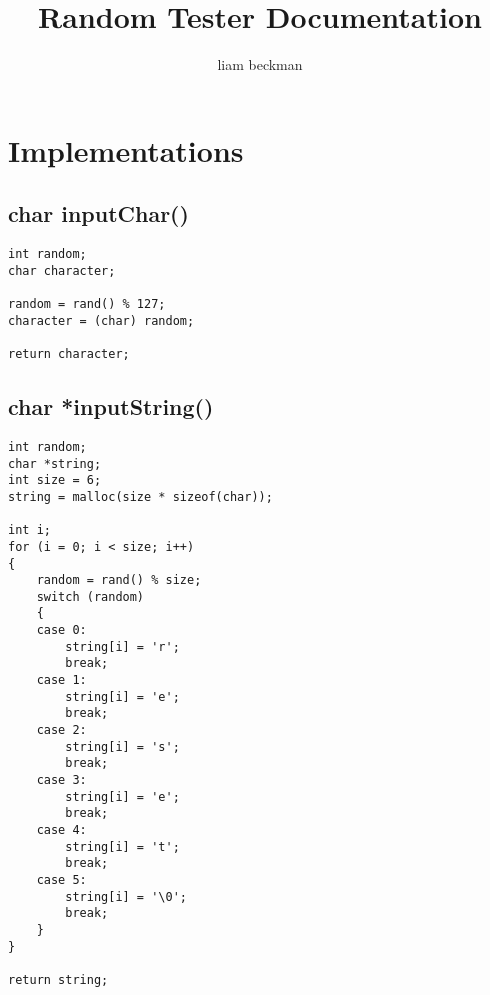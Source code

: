 \documentclass[11pt]{article}
\author{liam beckman}
\date{}
\title{Random Tester Documentation}
\begin{document}
\maketitle

\section{Implementations}
\label{sec:implementations}

\subsection{char inputChar()}
\label{sec:charinputchar}

\begin{listing}[htbp]
\begin{verbatim}
int random;
char character;

random = rand() % 127;
character = (char) random;

return character;
\end{verbatim}
\end{listing}

\subsection{char *inputString()}
\label{sec:charinputstring}

\begin{listing}[htbp]
\begin{verbatim}
int random;
char *string;
int size = 6;
string = malloc(size * sizeof(char));

int i;
for (i = 0; i < size; i++)
{
    random = rand() % size;
    switch (random)
    {
    case 0:
        string[i] = 'r';
        break;
    case 1:
        string[i] = 'e';
        break;
    case 2:
        string[i] = 's';
        break;
    case 3:
        string[i] = 'e';
        break;
    case 4:
        string[i] = 't';
        break;
    case 5:
        string[i] = '\0';
        break;
    }
}

return string;

\end{verbatim}
\end{listing}
\end{document}
